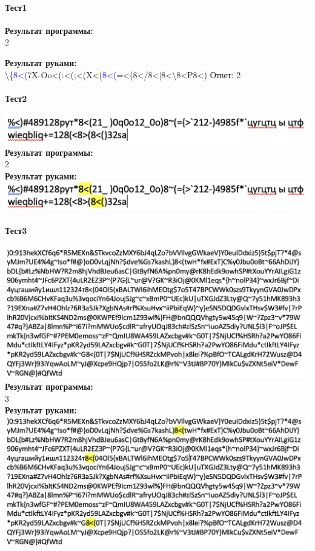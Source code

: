 \documentclass[12pt,onecolumn]{article}
\begin{document}
\begin{flushleft}
\paragraph{Тест1}
\hfill \break

\begin{minipage}{0.4\textwidth}
    \textbf{Результат программы:}\\
    2
  \end{minipage}
  \hfill
  \begin{minipage}{0.5\textwidth}
    \textbf{Результат руками:}\\
    \textbackslash\{\textcolor{blue}{8<(}7X-{Oo<(:<(;<(X<(\textcolor{blue}{8<(}}=<(8<{/8<|8<\textbackslash8<P8<)}
    Ответ: 2
  \end{minipage}
\paragraph{Тест2}
\hfill \break
\includegraphics[scale=0.4]{prog1/pt2.png}
\hfill \break
\textbf{Результат программы:}\\
2\\
\textbf{Результат руками:}
\hfill \break
\includegraphics[scale=0.4]{prog1/pt2+.png}
\paragraph{Тест3}
\hfill \break
\includegraphics[scale=0.4]{prog1/pt3.png}
\hfill \break
\textbf{Результат программы:}\\
3\\
\textbf{Результат руками:}
\hfill \break
\includegraphics[scale=0.4]{prog1/pt3+.png}

\end{flushleft}
\end{document}
